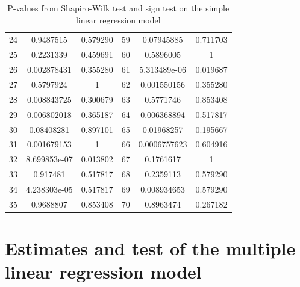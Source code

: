 \begin{table}
\begin{tabular}{c:cc|c:cc}
        24 & 0.9487515& 0.579290 & 59 & 0.07945885 & 0.711703 \\ 
        25 & 0.2231339 & 0.459691 & 60 &  0.5896005 & 1\\ 
        26 & 0.002878431& 0.355280 & 61 & 5.313489e-06 & 0.019687\\
        27 & 0.5797924 & 1 & 62 & 0.001550156 & 0.355280\\ 
        28 & 0.008843725& 0.300679 & 63 & 0.5771746 & 0.853408\\ 
        29 & 0.006802018&0.365187 & 64 & 0.006368894 & 0.517817\\ 
        30 & 0.08408281&0.897101 & 65 & 0.01968257 & 0.195667\\ 
        31 & 0.001679153& 1 & 66 & 0.0006757623 & 0.604916\\ 
        32 & 8.699853e-07& 0.013802 & 67 & 0.1761617 & 1\\ 
        33 & 0.917481&0.517817 & 68 & 0.2359113 & 0.579290\\ 
        34 & 4.238303e-05&0.517817 & 69 & 0.008934653 &0.579290 \\ 
        35 & 0.9688807&0.853408 & 70 & 0.8963474 & 0.267182\\
        \hline
    \end{tabular}
    \caption{P-values from Shapiro-Wilk test and sign test on the simple linear regression model}
    \label{tab: shapiro_simple_lm}
\end{table}

\section{Estimates and test of the multiple linear regression model}
